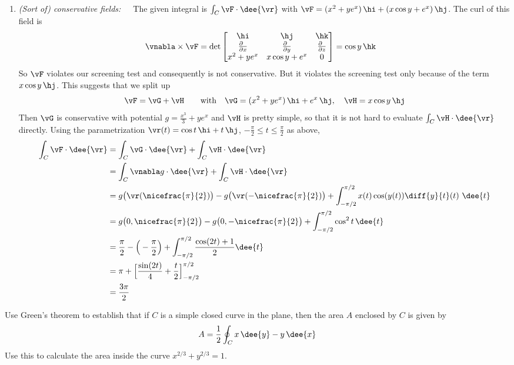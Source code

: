\begin{solution}
\begin{enumerate}[(1)]
\item \emph{(Sort of) conservative fields:}\ \ \ The given integral
is $\int_C\vF\cdot\dee{\vr}$ with
$\vF = (x^2 + y e^x ) \,\hi + (x \cos y + e^x ) \,\hj$. The curl of this
field is
\begin{align*}
\vnabla\times\vF
&=\det\left[\begin{matrix}
\hi &\hj &\hk \\
\tfrac{\partial\hfill}{\partial x} & \tfrac{\partial\hfill}{\partial y} &
                \tfrac{\partial\hfill}{\partial z} \\
x^2 + y e^x & x \cos y + e^x & 0
\end{matrix}
\right]
=\cos y\,\hk
\end{align*}
So $\vF$ violates our screening test and consequently is not conservative.
But it violates the screening test only because of the term $x\cos y\,\hj$.
This suggests that we split up
\begin{equation*}
\vF = \vG +\vH\qquad\text{with}\quad
\vG= (x^2 + y e^x ) \,\hi + e^x \,\hj,\quad
\vH = x\cos y\,\hj
\end{equation*}
Then $\vG$ is conservative with potential $g=\frac{x^3}{3}+ye^x$
and $\vH$ is pretty simple, so that it is not hard to evaluate
$\int_C\vH\cdot\dee{\vr}$ directly. Using the parametrization
$\vr(t) = \cos t\,\hi + t\,\hj$,  $-\frac{\pi}{2}\le t\le\frac{\pi}{2}$
as above,
\begin{align*}
\int_C\vF\cdot\dee{\vr}
&= \int_C\vG\cdot\dee{\vr} + \int_C\vH\cdot\dee{\vr} \\
&= \int_C\vnabla g\cdot\dee{\vr} + \int_C\vH\cdot\dee{\vr} \\
&=g\big(\vr(\nicefrac{\pi}{2})\big) -g\big(\vr(-\nicefrac{\pi}{2})\big)
   + \int_{-\pi/2}^{\pi/2} x(t) \cos(y(t)) \diff{y}{t}(t)\ \dee{t} \\
& =g\big(0,\nicefrac{\pi}{2}\big) -g\big(0,-\nicefrac{\pi}{2}\big)
   +\int_{-\pi/2}^{\pi/2} \cos^2 t \,\dee{t} \\
&=\frac{\pi}{2} -\Big(-\frac{\pi}{2}\Big)
   +\int_{-\pi/2}^{\pi/2} \frac{\cos(2t)+1}{2} \dee{t} \\
&=\pi  + \Big[ \frac{\sin(2t)}{4} +\frac{t}{2}\Big]_{-\pi/2}^{\pi/2} \\
&=\frac{3\pi}{2}
\end{align*}

\end{enumerate}

\end{solution}

\begin{question}[M317 2004A] %
 Use Green's theorem to establish that if $C$ is a simple
closed curve in the plane, then the area $A$ enclosed by $C$ is given by
\begin{equation*}
A=\frac{1}{2}\oint_C x\,\dee{y}-y\,\dee{x}
\end{equation*}
Use this to calculate the area inside the curve
$x^{2/3}+y^{2/3}=1$.
\end{question}

